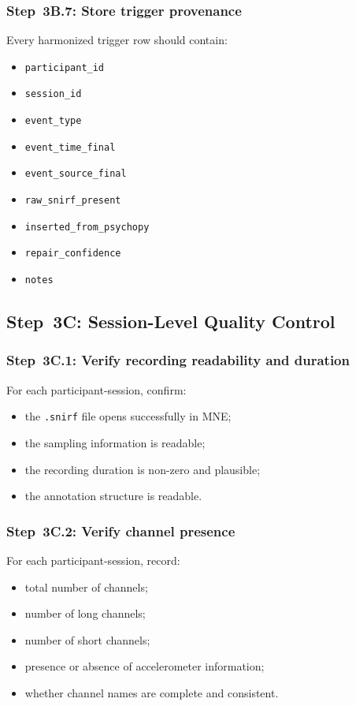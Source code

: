 \documentclass[11pt]{article}
\begin{document}
\subsubsection{Step~3B.7: Store trigger provenance}
Every harmonized trigger row should contain:
\begin{itemize}
    \item \texttt{participant\_id}
    \item \texttt{session\_id}
    \item \texttt{event\_type}
    \item \texttt{event\_time\_final}
    \item \texttt{event\_source\_final}
    \item \texttt{raw\_snirf\_present}
    \item \texttt{inserted\_from\_psychopy}
    \item \texttt{repair\_confidence}
    \item \texttt{notes}
\end{itemize}

\subsection{Step~3C: Session-Level Quality Control}

\subsubsection{Step~3C.1: Verify recording readability and duration}
For each participant-session, confirm:
\begin{itemize}
    \item the \texttt{.snirf} file opens successfully in MNE;
    \item the sampling information is readable;
    \item the recording duration is non-zero and plausible;
    \item the annotation structure is readable.
\end{itemize}

\subsubsection{Step~3C.2: Verify channel presence}
For each participant-session, record:
\begin{itemize}
    \item total number of channels;
    \item number of long channels;
    \item number of short channels;
    \item presence or absence of accelerometer information;
    \item whether channel names are complete and consistent.
\end{itemize}
\end{document}
